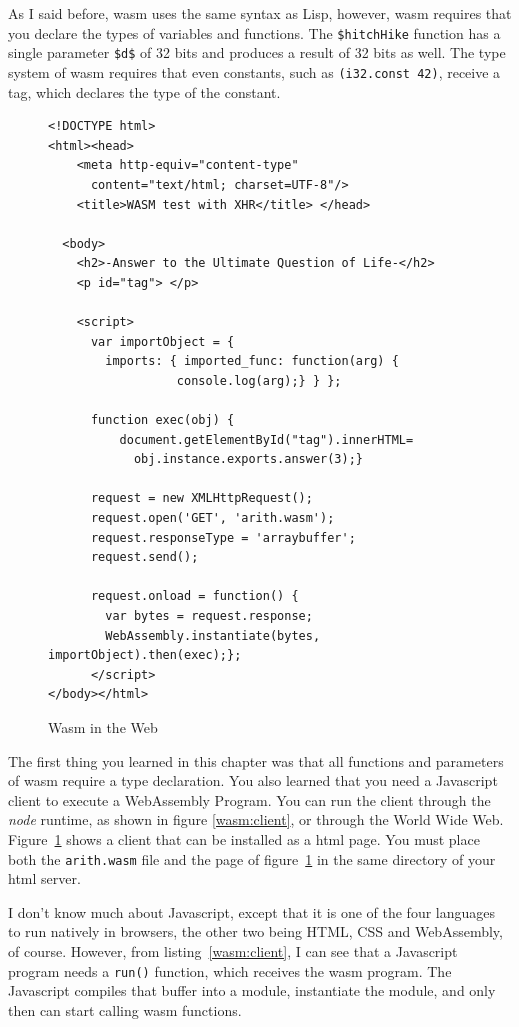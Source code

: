 \documentclass[a4paper,12pt]{book}
\begin{document}
As I said before, wasm uses the same syntax
as Lisp, however, wasm requires that you declare
the types of variables and functions. The
\verb|$hitchHike| function has a single
parameter \verb|$d$| of 32 bits and produces
a result of 32 bits as well. The type system
of wasm requires that even constants, such
as \verb|(i32.const 42)|, receive a tag, which
declares the type of the constant.


\begin{figure}[!h]
\begin{verbatim}
<!DOCTYPE html>
<html><head>
    <meta http-equiv="content-type"
      content="text/html; charset=UTF-8"/>
    <title>WASM test with XHR</title> </head>

  <body>
    <h2>-Answer to the Ultimate Question of Life-</h2>
    <p id="tag"> </p>

    <script>
      var importObject = {
        imports: { imported_func: function(arg) {
  	              console.log(arg);} } };

      function exec(obj) {
          document.getElementById("tag").innerHTML=
            obj.instance.exports.answer(3);}

      request = new XMLHttpRequest();
      request.open('GET', 'arith.wasm');
      request.responseType = 'arraybuffer';
      request.send();
      
      request.onload = function() {
        var bytes = request.response;
        WebAssembly.instantiate(bytes, importObject).then(exec);};
      </script>
</body></html>
\end{verbatim}

\caption{Wasm in the Web}
\label{wasm:web}
\end{figure}

The first thing you learned in this
chapter was that all functions and parameters
of wasm require a type declaration. You also 
learned that you need a Javascript client
to execute a WebAssembly Program. You can run
the client through the {\em node} runtime, as
shown in figure \ref{wasm:client}, or through the
World Wide Web. Figure~\ref{wasm:web} shows
a client that can be installed as a html page.
You must place both the \verb|arith.wasm| file
and the page of figure~\ref{wasm:web} in the same
directory of your html server.

I don't know much about Javascript, except that
it is one of the four languages to run natively
in browsers, the other two being HTML, CSS and
WebAssembly, of course. However, from
listing~\ref{wasm:client}, I can see that
a Javascript program needs a \verb|run()|
function, which receives the wasm program.
The Javascript compiles that buffer into a module,
instantiate the module, and only then can start
calling wasm functions.
\end{document}
